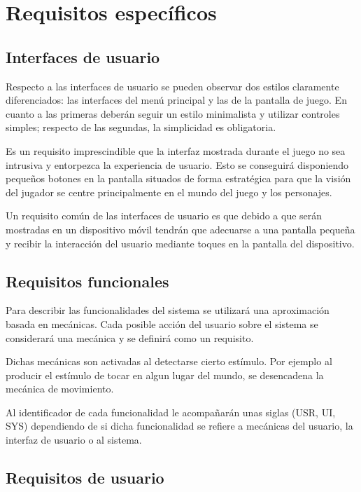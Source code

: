 \section{Requisitos específicos}

\subsection{Interfaces de usuario}

Respecto a las interfaces de usuario se pueden observar dos estilos claramente diferenciados: las interfaces del menú principal y las de la pantalla de juego. En cuanto a las primeras deberán seguir un estilo minimalista y utilizar controles simples; respecto de las segundas, la simplicidad es obligatoria.

Es un requisito imprescindible que la interfaz mostrada durante el juego no sea intrusiva y entorpezca la experiencia de usuario. Esto se conseguirá disponiendo pequeños botones en la pantalla situados de forma estratégica para que la visión del jugador se centre principalmente en el mundo del juego y los personajes.

Un requisito común de las interfaces de usuario es que debido a que serán mostradas en un dispositivo móvil tendrán que adecuarse a una pantalla pequeña y recibir la interacción del usuario mediante toques en la pantalla del dispositivo.

\subsection{Requisitos funcionales}

Para describir las funcionalidades del sistema se utilizará una aproximación basada en mecánicas. Cada posible acción del usuario sobre el sistema se considerará una mecánica y se definirá como un requisito. 

Dichas mecánicas son activadas al detectarse cierto estímulo. Por ejemplo al producir el estímulo de tocar en algun lugar del mundo, se desencadena la mecánica de movimiento.

Al identificador de cada funcionalidad le acompañarán unas siglas (USR, UI, SYS) dependiendo de si dicha funcionalidad se refiere a mecánicas del usuario, la interfaz de usuario o al sistema.

\subsection{Requisitos de usuario}

